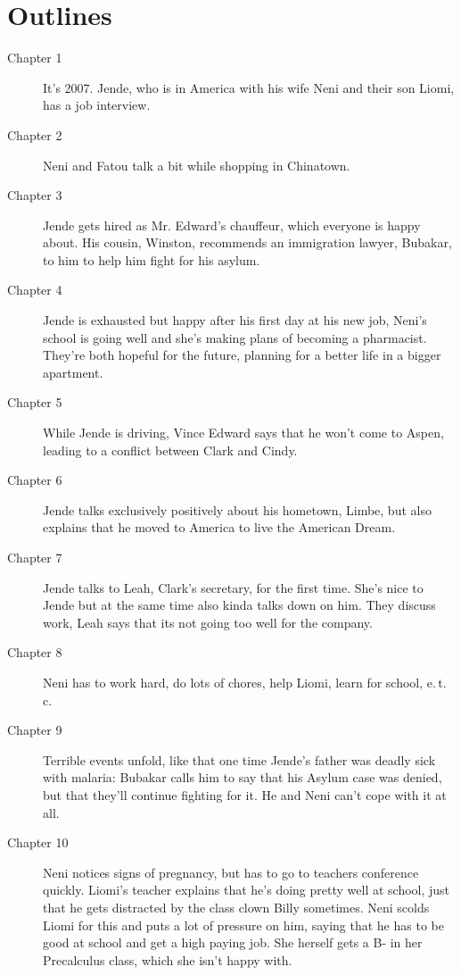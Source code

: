 \documentclass{article}
\begin{document}
\section*{Outlines} 
\begin{description}
 \item[Chapter 1] It's 2007. Jende, who is in America with his wife Neni and their son Liomi, has a job interview.
 \item[Chapter 2] Neni and Fatou talk a bit while shopping in Chinatown.
 \item[Chapter 3] Jende gets hired as Mr. Edward's chauffeur, which everyone is happy about. His cousin, Winston, recommends an immigration lawyer, Bubakar, to him to help him fight for his asylum.
 \item[Chapter 4] Jende is exhausted but happy after his first day at his new job, Neni's school is going well and she's making plans of becoming a pharmacist. They're both hopeful for the future, planning for a better life in a bigger apartment.
 \item[Chapter 5] While Jende is driving, Vince Edward says that he won't come to Aspen, leading to a conflict between Clark and Cindy.
 \item[Chapter 6] Jende talks exclusively positively about his hometown, Limbe, but also explains that he moved to America to live the American Dream.
 \item[Chapter 7] Jende talks to Leah, Clark's secretary, for the first time. She's nice to Jende but at the same time also kinda talks down on him. They discuss work, Leah says that its not going too well for the company. 
 \item[Chapter 8] Neni has to work hard, do lots of chores, help Liomi, learn for school, e.\,t.\,c. 
 \item[Chapter 9] Terrible events unfold, like that one time Jende's father was deadly sick with malaria: Bubakar calls him to say that his Asylum case was denied, but that they'll continue fighting for it. He and Neni can't cope with it at all.
 \item[Chapter 10] Neni notices signs of pregnancy, but has to go to teachers conference quickly. Liomi's teacher explains that he's doing pretty well at school, just that he gets distracted by the class clown Billy sometimes. Neni scolds Liomi for this and puts a lot of pressure on him, saying that he has to be good at school and get a high paying job. She herself gets a B- in her Precalculus class, which she isn't happy with.
\end{description} 
 
 
\end{document}
